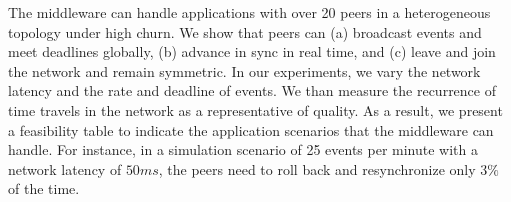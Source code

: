 \documentclass[fleqn,10pt]{SelfArx}
\begin{document}
The middleware can handle applications with over 20 peers in a heterogeneous
topology under high churn.
%
We show that peers can
    (a) broadcast events and meet deadlines globally, 
    (b) advance in sync in real time, and
    (c) leave and join the network and remain symmetric.
%
In our experiments, we vary the network latency and the rate and deadline of
events.
We than measure the recurrence of time travels in the network as a
representative of quality.
%
As a result, we present a feasibility table to indicate the application
scenarios that the middleware can handle.
For instance, in a simulation scenario of 25 events per minute with a network
latency of $50ms$, the peers need to roll back and resynchronize only $3\%$ of
the time.





\makeatletter
\renewcommand\@biblabel[1]{{\parbox{0.7cm}{[#1]}}}
\makeatother
\renewcommand{\refname}{References}


\balance
\end{document}
